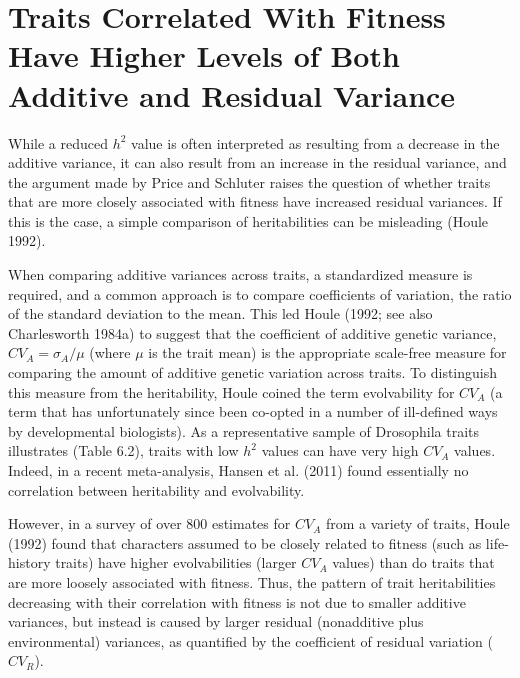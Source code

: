 \documentclass{article}
\begin{document}
\section{Traits Correlated With Fitness Have Higher Levels of Both Additive and Residual Variance}
While a reduced  $ h^{2} $ value is often interpreted as resulting from a decrease in the additive variance, it can also result from an increase in the residual variance, and the argument made by Price and Schluter raises the question of whether traits that are more closely associated with fitness have increased residual variances. If this is the case, a simple comparison of heritabilities can be misleading (Houle 1992).

When comparing additive variances across traits, a standardized measure is required, and a common approach is to compare coefficients of variation, the ratio of the standard deviation to the mean. This led Houle (1992; see also Charlesworth 1984a) to suggest that the coefficient of additive genetic variance,  $ CV_A = \sigma_A / \mu $ (where  $ \mu $ is the trait mean) is the appropriate scale-free measure for comparing the amount of additive genetic variation across traits. To distinguish this measure from the heritability, Houle coined the term evolvability for  $ CV_A $ (a term that has unfortunately since been co-opted in a number of ill-defined ways by developmental biologists). As a representative sample of Drosophila traits illustrates (Table 6.2), traits with low  $ h^2 $ values can have very high  $ CV_A $ values. Indeed, in a recent meta-analysis, Hansen et al. (2011) found essentially no correlation between heritability and evolvability.

However, in a survey of over 800 estimates for  $ CV_A $ from a variety of traits, Houle (1992) found that characters assumed to be closely related to fitness (such as life-history traits) have higher evolvabilities (larger  $ CV_A $ values) than do traits that are more loosely associated with fitness. Thus, the pattern of trait heritabilities decreasing with their correlation with fitness is not due to smaller additive variances, but instead is caused by larger residual (nonadditive plus environmental) variances, as quantified by the coefficient of residual variation ( $ CV_R $).
\end{document}
